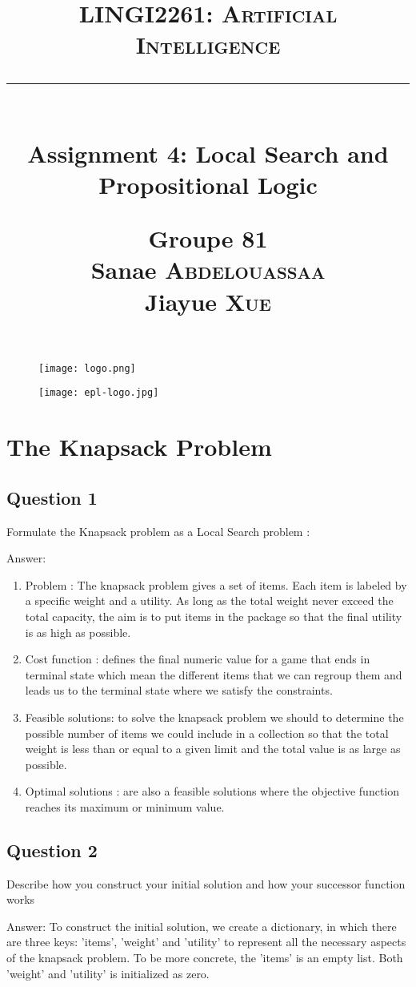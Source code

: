 \documentclass[12pt, a4paper]{report}
\title{
    \vspace{0.5cm} \textcolor{db}{\textsc{LINGI2261: Artificial Intelligence}} \\
    \vspace{0.5 cm} \rule{10 cm}{0.5pt} \\
    \vspace{0.5 cm} \Large{Assignment 4: Local Search and Propositional Logic} \\
    \vspace{3 cm}
    \begin{flushright}
        \large
        \textbf{Groupe 81} \\
        Sanae \textsc{Abdelouassaa} \\
        Jiayue \textsc{Xue} \\     
    \end{flushright}
    \vspace{0.5 cm}
}
\begin{document}
\begin{figure}[t]
    \texttt{[image: logo.png]}
 \end{figure}

\begin{figure}[t]
    \hspace{10 cm} \texttt{[image: epl-logo.jpg]}
\end{figure}

\maketitle

\tableofcontents

\chapter{The Knapsack Problem}

\section{Question 1}
Formulate the Knapsack problem as a Local Search problem :
\vspace{0.5 cm}
\par Answer:
\begin{enumerate}
    \item Problem : The knapsack problem gives a set of items. Each item is labeled by a specific weight and a utility. As long as the total weight never exceed the total capacity, the aim is to put items in the package so that the final utility is as high as possible.  
    \item Cost function : defines the final numeric value for a game that ends in terminal state which mean the different items that we can regroup them and leads us to the terminal state where we satisfy the constraints.
    \item Feasible solutions:  to solve the knapsack problem we should to determine the possible number of items we could include in a collection so that the total weight is less than or equal to a given limit and the total value is as large as possible.
    \item Optimal solutions : are also a feasible solutions where the objective function reaches its maximum or minimum value.
    
\end{enumerate}
\section{Question 2}
Describe how you construct your initial solution and how your successor function works
\par Answer:
To construct the initial solution, we create a dictionary, in which there are three keys: 'items', 'weight' and 'utility' to represent all the necessary aspects of the knapsack problem. To be more concrete, the 'items' is an empty list. Both 'weight' and 'utility' is initialized as zero.
\end{document}
